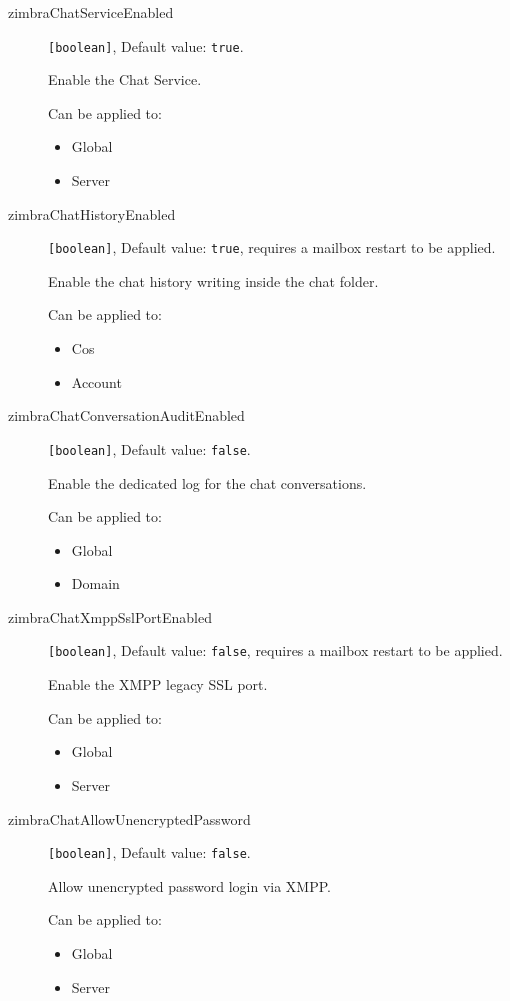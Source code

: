 \begin{description}
\item [zimbraChatServiceEnabled] \verb![boolean]!, Default value: \verb!true!.

Enable the Chat Service.

Can be applied to:
\begin{itemize}
\item Global
\item Server
\end{itemize}

\item [zimbraChatHistoryEnabled] \verb![boolean]!, Default value: \verb!true!, requires a mailbox restart to be applied.

Enable the chat history writing inside the chat folder.

Can be applied to:
\begin{itemize}
\item Cos
\item Account
\end{itemize}

\item [zimbraChatConversationAuditEnabled] \verb![boolean]!, Default value: \verb!false!.

Enable the dedicated log for the chat conversations.

Can be applied to:
\begin{itemize}
\item Global
\item Domain
\end{itemize}

\item [zimbraChatXmppSslPortEnabled] \verb![boolean]!, Default value: \verb!false!, requires a mailbox restart to be applied.

Enable the XMPP legacy SSL port.

Can be applied to:
\begin{itemize}
\item Global
\item Server
\end{itemize}

\item [zimbraChatAllowUnencryptedPassword] \verb![boolean]!, Default value: \verb!false!.

Allow unencrypted password login via XMPP.

Can be applied to:
\begin{itemize}
\item Global
\item Server
\end{itemize}


\end{description}
